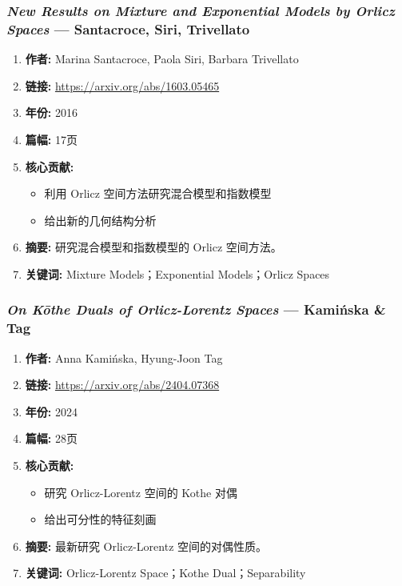 \subsubsection{\textbf{\textit{New Results on Mixture and Exponential Models by Orlicz Spaces}} — Santacroce, Siri, Trivellato}
\begin{enumerate}
    \item \textbf{作者:} Marina Santacroce, Paola Siri, Barbara Trivellato
    \item \textbf{链接:} \url{https://arxiv.org/abs/1603.05465}
    \item \textbf{年份:} 2016
    \item \textbf{篇幅:} 17页
    \item \textbf{核心贡献:}
        \begin{itemize}
            \item 利用 Orlicz 空间方法研究混合模型和指数模型
            \item 给出新的几何结构分析
        \end{itemize}
    \item \textbf{摘要:} 研究混合模型和指数模型的 Orlicz 空间方法。
    \item \textbf{关键词:} Mixture Models；Exponential Models；Orlicz Spaces
\end{enumerate}

\subsubsection{\textbf{\textit{On Kōthe Duals of Orlicz-Lorentz Spaces}} — Kamińska \& Tag}
\begin{enumerate}
    \item \textbf{作者:} Anna Kamińska, Hyung-Joon Tag
    \item \textbf{链接:} \url{https://arxiv.org/abs/2404.07368}
    \item \textbf{年份:} 2024
    \item \textbf{篇幅:} 28页
    \item \textbf{核心贡献:}
        \begin{itemize}
            \item 研究 Orlicz-Lorentz 空间的 Kothe 对偶
            \item 给出可分性的特征刻画
        \end{itemize}
    \item \textbf{摘要:} 最新研究 Orlicz-Lorentz 空间的对偶性质。
    \item \textbf{关键词:} Orlicz-Lorentz Space；Kothe Dual；Separability
\end{enumerate}

